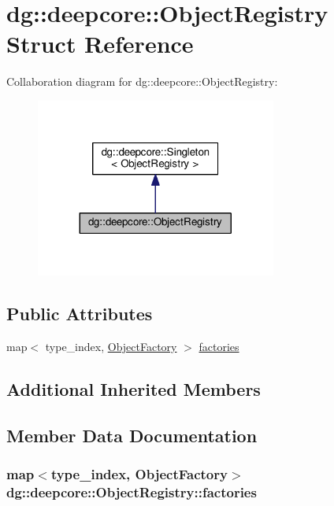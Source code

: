 \hypertarget{structdg_1_1deepcore_1_1_object_registry}{}\section{dg\+:\+:deepcore\+:\+:Object\+Registry Struct Reference}
\label{structdg_1_1deepcore_1_1_object_registry}


Collaboration diagram for dg\+:\+:deepcore\+:\+:Object\+Registry\+:
\nopagebreak
\begin{figure}[H]
\begin{center}
\leavevmode
\includegraphics[width=224pt]{structdg_1_1deepcore_1_1_object_registry__coll__graph}
\end{center}
\end{figure}
\subsection*{Public Attributes}
\begin{DoxyCompactItemize}
\item 
map$<$ type\+\_\+index, \hyperlink{group___process_type_ga31f9e496107d11d745b3b405d38f0e64}{Object\+Factory} $>$ \hyperlink{structdg_1_1deepcore_1_1_object_registry_a910905704065ef4094b46f335bcdeb24}{factories}
\end{DoxyCompactItemize}
\subsection*{Additional Inherited Members}


\subsection{Member Data Documentation}
\subsubsection[{\texorpdfstring{factories}{factories}}]{\setlength{\rightskip}{0pt plus 5cm}map$<$type\+\_\+index, {\bf Object\+Factory}$>$ dg\+::deepcore\+::\+Object\+Registry\+::factories}\hypertarget{structdg_1_1deepcore_1_1_object_registry_a910905704065ef4094b46f335bcdeb24}{}\label{structdg_1_1deepcore_1_1_object_registry_a910905704065ef4094b46f335bcdeb24}
